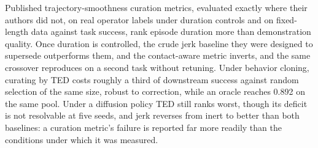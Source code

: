\documentclass[10pt]{article}
\begin{document}
Published trajectory-smoothness curation metrics, evaluated exactly where
their authors did not, on real operator labels under duration controls and
on fixed-length data against task success, rank episode duration more than
demonstration quality. Once duration is controlled, the crude jerk baseline
they were designed to supersede outperforms them, and the contact-aware
metric inverts, and the same crossover reproduces on a second task without
retuning. Under behavior cloning, curating by TED costs roughly a third of
downstream success against random selection of the same size, robust to
correction, while an oracle reaches 0.892 on the same pool. Under a
diffusion policy TED still ranks worst, though its deficit is not
resolvable at five seeds, and jerk reverses from inert to better than both
baselines: a curation metric's failure is reported far more readily than
the conditions under which it was measured.
\end{document}

